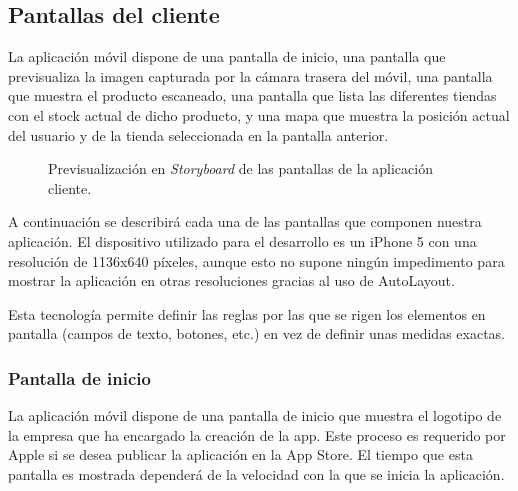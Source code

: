 \subsection{Pantallas del cliente}
La aplicación móvil dispone de una pantalla de inicio, una pantalla que previsualiza la imagen capturada por la cámara trasera del móvil, una pantalla que muestra el producto escaneado, una pantalla que lista las diferentes tiendas con el stock actual de dicho producto, y una mapa que muestra la posición actual del usuario y de la tienda seleccionada en la pantalla anterior.

\begin{figure}[H]
	\centering
	\caption{Previsualización en \emph{Storyboard} de las pantallas de la aplicación cliente.}
	\label{fig:storyboard}
\end{figure}

A continuación se describirá cada una de las pantallas que componen nuestra aplicación. El dispositivo utilizado para el desarrollo es un iPhone 5 con una resolución de 1136x640 píxeles, aunque esto no supone ningún impedimento para mostrar la aplicación en otras resoluciones gracias al uso de AutoLayout.

Esta tecnología permite definir las reglas por las que se rigen los elementos en pantalla (campos de texto, botones, etc.) en vez de definir unas medidas exactas.

\subsubsection{Pantalla de inicio}
La aplicación móvil dispone de una pantalla de inicio que muestra el logotipo de la empresa que ha encargado la creación de la app. Este proceso es requerido por Apple si se desea publicar la aplicación en la App Store. El tiempo que esta pantalla es mostrada dependerá de la velocidad con la que se inicia la aplicación.

